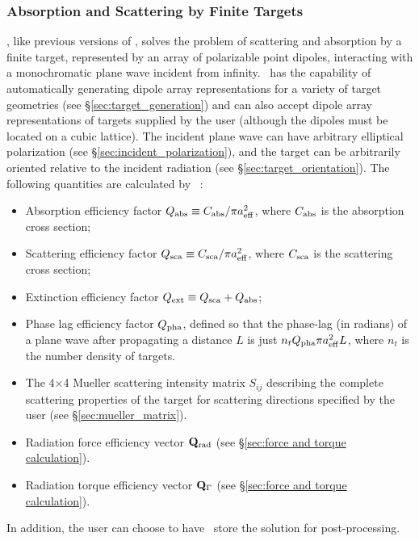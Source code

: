 {\subsubsection{Absorption and Scattering by Finite Targets}
\ddscatv, like previous versions of \ddscat,
solves the problem of scattering and 
absorption by a finite target, represented by an array of
polarizable point dipoles, interacting with a monochromatic plane wave incident
from infinity.  
\ddscatv\ has the capability of automatically generating dipole
array representations for a variety of target geometries 
(see \S\ref{sec:target_generation}) and can also accept dipole
array representations of targets supplied by the user (although
the dipoles must be located on a cubic lattice).
The incident plane wave can have arbitrary elliptical
polarization (see \S\ref{sec:incident_polarization}), 
and the target can be arbitrarily oriented relative to the
incident radiation (see \S\ref{sec:target_orientation}).
The following quantities are calculated by \ddscatv\ :
\begin{itemize}
\item Absorption efficiency factor $Q_{\rm abs}\equiv C_{\rm abs}/\pi a_{\rm eff}^2$,
where $C_{\rm abs}$ is the absorption cross section;
\item Scattering efficiency factor $Q_{\rm sca}\equiv C_{\rm sca}/\pi a_{\rm eff}^2$,
where $C_{\rm sca}$ is the scattering cross section;
\item Extinction efficiency factor $Q_{\rm ext}\equiv Q_{\rm sca}+Q_{\rm abs}$;
\item Phase lag efficiency factor $Q_{\rm pha}$, 
defined so that the phase-lag
(in radians) of a plane wave after propagating a distance $L$ is just
$n_{t}Q_{\rm pha}\pi a_{\rm eff}^2 L$, 
where $n_t$ is the number density of targets.
\item The 4$\times$4 Mueller scattering intensity matrix $S_{ij}$ 
describing the complete
scattering properties of the target for scattering directions specified
by the user (see \S\ref{sec:mueller_matrix}).
\item Radiation force efficiency vector ${\bf Q}_{\rm rad}$ 
(see \S\ref{sec:force and torque calculation}).
\item Radiation torque efficiency vector ${\bf Q}_\Gamma$
(see \S\ref{sec:force and torque calculation}).
\end{itemize}
In addition, the user can choose to have \ddscatv\ store the solution for
post-processing.  

}
